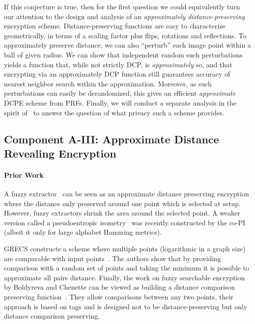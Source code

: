 If this conjecture is true, then for the first question we could equivalently turn our attention to the design and analysis of  an \emph{approximately distance-preserving} encryption scheme. 
Distance-preserving functions are easy to characterize geometrically, in terms of a scaling factor plus flips, rotations and reflections.  To approximately preserve distance, we can also  ``perturb'' each image point within a ball of given radius.  
We can show that independent random such perturbations yields a function that, while not strictly DCP, is \emph{approximately} so, and that encrypting via an approximately DCP function still guarantees accuracy of nearest neighbor  search within the approximation.  Moreover, as such perturbations can easily be derandomized, this gives an efficient \emph{approximate} DCPE scheme from PRFs.  Finally, we will conduct a separate analysis in the spirit of~\cite{C:BolCheOne11} to answer the question of what privacy such a scheme provides.  

\subsection{Component A-III: Approximate Distance Revealing Encryption}
\paragraph{Prior Work}
A fuzzy extractor~\cite{EC:DodReySmi04} can be seen as an approximate distance preserving encryption where the distance only preserved around one point which is selected at setup.  However, fuzzy extractors shrink the area around the selected point.  A weaker version called a pseudoentropic isometry~\cite{EPRINT:ABCFG16} was recently constructed by the co-PI (albeit it only for large alphabet Hamming metrics).

GRECS constructs a scheme where multiple points (logarithmic in a graph size) are comparable with input points~\cite{meng2015grecs}.  The authors show that by providing comparison with a random set of points and taking the minimum it is possible to approximate all pairs distance.
Finally, the work on fuzzy searchable encryption by Boldyreva and Chenette can be viewed as building a distance comparison preserving function~\cite{boldyreva2014efficient}.  They allow comparisons between any two points, their approach is based on tags and is designed not to be distance-preserving but only distance comparison preserving.


